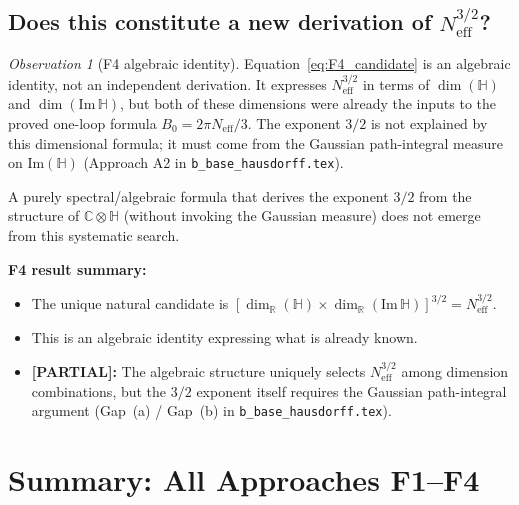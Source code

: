 \documentclass[11pt,a4paper]{article}
\theoremstyle{definition}
\theoremstyle{remark}
\newtheorem{observation}{Observation}
\begin{document}
\subsection{Does this constitute a new derivation of $N_{\mathrm{eff}}^{3/2}$?}

\begin{observation}[F4 algebraic identity]
  \label{obs:F4}
  Equation~\eqref{eq:F4_candidate} is an algebraic identity, not an independent
  derivation.
  It expresses $N_{\mathrm{eff}}^{3/2}$ in terms of $\dim(\mathbb{H})$ and
  $\dim(\mathrm{Im}\,\mathbb{H})$, but both of these dimensions were already
  the inputs to the proved one-loop formula $B_0 = 2\pi N_{\mathrm{eff}}/3$.
  The exponent $3/2$ is not explained by this dimensional formula; it
  must come from the Gaussian path-integral measure on
  $\mathrm{Im}(\mathbb{H})$ (Approach A2 in \texttt{b\_base\_hausdorff.tex}).
\end{observation}

A purely spectral/algebraic formula that derives the exponent $3/2$ from
the structure of $\mathbb{C}\otimes\mathbb{H}$ (without invoking the
Gaussian measure) does not emerge from this systematic search.

\textbf{F4 result summary:}
\begin{itemize}
  \item The unique natural candidate is $[\dim_\mathbb{R}(\mathbb{H}) \times
    \dim_\mathbb{R}(\mathrm{Im}\,\mathbb{H})]^{3/2} = N_{\mathrm{eff}}^{3/2}$.
  \item This is an algebraic identity expressing what is already known.
  \item \textbf{[PARTIAL]:} The algebraic structure uniquely selects
    $N_{\mathrm{eff}}^{3/2}$ among dimension combinations, but the $3/2$
    exponent itself requires the Gaussian path-integral argument (Gap~(a) /
    Gap~(b) in \texttt{b\_base\_hausdorff.tex}).
\end{itemize}

\section{Summary: All Approaches F1--F4}
\label{sec:summary_F}
\end{document}
